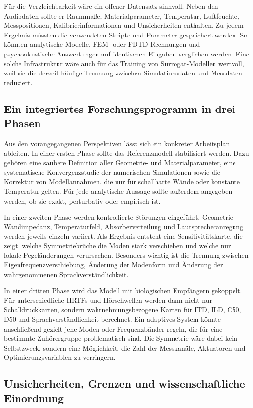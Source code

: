 ﻿\documentclass[12pt, a4paper]{article}
\theoremstyle{definition}
\theoremstyle{remark}
\begin{document}
Für die Vergleichbarkeit wäre ein offener Datensatz sinnvoll. Neben den Audiodaten
sollte er Raummaße, Materialparameter, Temperatur, Luftfeuchte, Messpositionen,
Kalibrierinformationen und Unsicherheiten enthalten. Zu jedem Ergebnis müssten die
verwendeten Skripte und Parameter gespeichert werden. So könnten analytische Modelle,
FEM- oder FDTD-Rechnungen und psychoakustische Auswertungen auf identischen Eingaben
verglichen werden. Eine solche Infrastruktur wäre auch für das Training von
Surrogat-Modellen wertvoll, weil sie die derzeit häufige Trennung zwischen
Simulationsdaten und Messdaten reduziert.

\subsection{Ein integriertes Forschungsprogramm in drei Phasen}

Aus den vorangegangenen Perspektiven lässt sich ein konkreter Arbeitsplan ableiten.
In einer ersten Phase sollte das Referenzmodell stabilisiert werden. Dazu gehören
eine saubere Definition aller Geometrie- und Materialparameter, eine systematische
Konvergenzstudie der numerischen Simulationen sowie die Korrektur von Modellannahmen,
die nur für schallharte Wände oder konstante Temperatur gelten. Für jede analytische
Aussage sollte außerdem angegeben werden, ob sie exakt, perturbativ oder empirisch
ist.

In einer zweiten Phase werden kontrollierte Störungen eingeführt. Geometrie,
Wandimpedanz, Temperaturfeld, Absorberverteilung und Lautsprecheranregung werden
jeweils einzeln variiert. Als Ergebnis entsteht eine Sensitivitätskarte, die zeigt,
welche Symmetriebrüche die Moden stark verschieben und welche nur lokale
Pegeländerungen verursachen. Besonders wichtig ist die Trennung zwischen
Eigenfrequenzverschiebung, Änderung der Modenform und Änderung der wahrgenommenen
Sprachverständlichkeit.

In einer dritten Phase wird das Modell mit biologischen Empfängern gekoppelt. Für
unterschiedliche HRTFs und Hörschwellen werden dann nicht nur Schalldruckkarten,
sondern wahrnehmungsbezogene Karten für ITD, ILD, C50, D50 und Sprachverständlichkeit
berechnet. Ein adaptives System könnte anschließend gezielt jene Moden oder
Frequenzbänder regeln, die für eine bestimmte Zuhörergruppe problematisch sind.
Die Symmetrie wäre dabei kein Selbstzweck, sondern eine Möglichkeit, die Zahl der
Messkanäle, Aktuatoren und Optimierungsvariablen zu verringern.

\subsection{Unsicherheiten, Grenzen und wissenschaftliche Einordnung}
\end{document}
